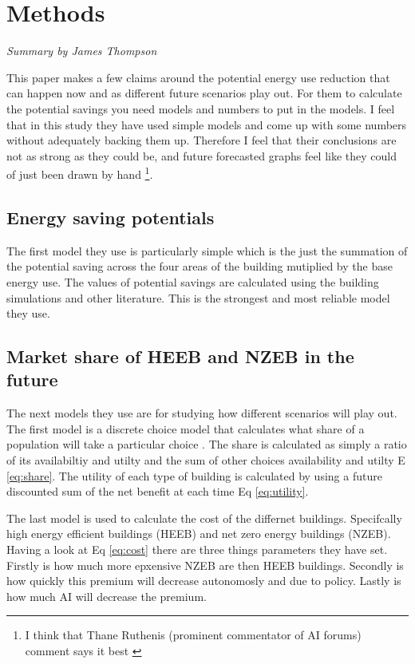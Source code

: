 \documentclass[conference,a4paper]{IEEEtran}
\begin{document}
\section*{Methods}
\textit{Summary by James Thompson}

This paper makes a few claims around the potential energy use reduction that can happen now and as different future scenarios play out. For them to calculate the potential savings you need models and numbers to put in the models. I feel that in this study they have used simple models and come up with some numbers without adequately backing them up. Therefore I feel that their conclusions are not as strong as they could be, and future forecasted graphs feel like they could of just been drawn by hand \footnote{I think that Thane Ruthenis (prominent commentator of AI forums) comment says it best \cite{ruthenisDeepCritiqueAI2025}}.

\subsection*{Energy saving potentials}

The first model they use is particularly simple which is the just the summation of the potential saving across the four areas of the building mutiplied by the base energy use. The values of potential savings are calculated using the building simulations and other literature. This is the strongest and most reliable model they use.

\subsection*{Market share of HEEB and NZEB in the future}

The next models they use are for studying how different scenarios will play out. The first model is a discrete choice model that calculates what share of a population will take a particular choice . The share is calculated as simply a ratio of its availabiltiy and utilty and the sum of other choices availability and utilty E \ref{eq:share}. The utility of each type of building is calculated by using a future discounted sum of the net benefit at each time Eq \ref{eq:utility}.

The last model is used to calculate the cost of the differnet buildings. Specifcally high energy efficient buildings (HEEB) and net zero energy buildings (NZEB). Having a look at Eq \ref{eq:cost} there are three things parameters they have set. Firstly is how much more epxensive NZEB are then HEEB buildings. Secondly is how quickly this premium will decrease autonomosly and due to policy. Lastly is how much AI will decrease the premium.
\end{document}
